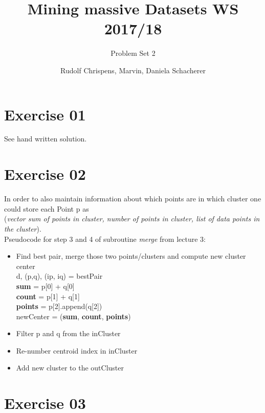 \documentclass[11pt,a4paper]{scrartcl}
\title{Mining massive Datasets WS 2017/18}
\subtitle{Problem Set 2}
\author{Rudolf Chrispens, Marvin, Daniela Schacherer}
\begin{document}
\maketitle

	\section*{Exercise 01}
	
	
	See hand written solution. 
	\section*{Exercise 02}
	In order to also maintain information about which points are in which cluster one could store each Point p as \\
(\textit{vector sum of points in cluster, number of points in cluster, list of data points in the cluster}). \\

Pseudocode for step 3 and 4 of subroutine \textit{merge} from lecture 3:
	\begin{itemize}
		\item Find best pair, merge those two points/clusters and compute new cluster center\\
		d, (p,q), (ip, iq) = bestPair\\
		\textbf{sum} = p[0] + q[0] \\
		\textbf{count} = p[1] + q[1] \\
		\textbf{points} = p[2].append(q[2]) \\
		newCenter = (\textbf{sum}, \textbf{count}, \textbf{points}) \\

		\item Filter p and q from the inCluster
		\item Re-number centroid index in inCluster
		\item Add new cluster to the outCluster
		
	\end{itemize}


\section*{Exercise 03}
\end{document}
